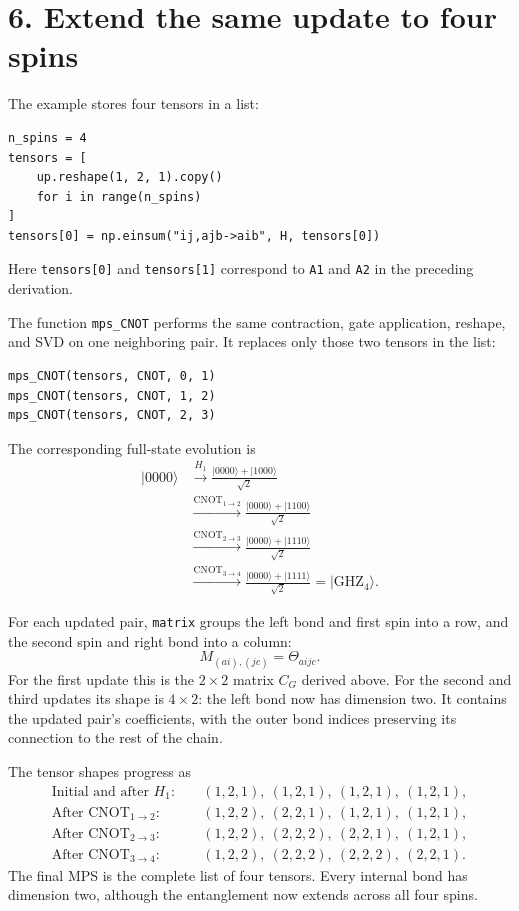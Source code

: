 \documentclass[11pt]{article}
\newcommand{\ket}[1]{\lvert #1\rangle}
\begin{document}
\newpage
\section*{6. Extend the same update to four spins}

The example stores four tensors in a list:
\begin{lstlisting}
n_spins = 4
tensors = [
    up.reshape(1, 2, 1).copy()
    for i in range(n_spins)
]
tensors[0] = np.einsum("ij,ajb->aib", H, tensors[0])
\end{lstlisting}
Here \texttt{tensors[0]} and \texttt{tensors[1]} correspond
to \texttt{A1} and \texttt{A2} in the preceding derivation.

The function \texttt{mps\_CNOT} performs the same contraction,
gate application, reshape, and SVD on one neighboring pair.
It replaces only those two tensors in the list:
\begin{lstlisting}
mps_CNOT(tensors, CNOT, 0, 1)
mps_CNOT(tensors, CNOT, 1, 2)
mps_CNOT(tensors, CNOT, 2, 3)
\end{lstlisting}

The corresponding full-state evolution is
\begin{align*}
\ket{0000}
&\xrightarrow{H_1}
\frac{\ket{0000}+\ket{1000}}{\sqrt2}\\
&\xrightarrow{\mathrm{CNOT}_{1\to2}}
\frac{\ket{0000}+\ket{1100}}{\sqrt2}\\
&\xrightarrow{\mathrm{CNOT}_{2\to3}}
\frac{\ket{0000}+\ket{1110}}{\sqrt2}\\
&\xrightarrow{\mathrm{CNOT}_{3\to4}}
\frac{\ket{0000}+\ket{1111}}{\sqrt2}
=\ket{\mathrm{GHZ}_4}.
\end{align*}

For each updated pair, \texttt{matrix} groups the left bond
and first spin into a row, and the second spin and right
bond into a column:
\[
M_{(ai),(jc)}=\Theta_{aijc}.
\]
For the first update this is the $2\times2$ matrix $C_G$
derived above. For the second and third updates its shape
is $4\times2$: the left bond now has dimension two.
It contains the updated pair's coefficients, with the outer
bond indices preserving its connection to the rest of the chain.

The tensor shapes progress as
\begin{align*}
\text{Initial and after }H_1:\quad&
(1,2,1),\ (1,2,1),\ (1,2,1),\ (1,2,1),\\
\text{After CNOT}_{1\to2}:\quad&
(1,2,2),\ (2,2,1),\ (1,2,1),\ (1,2,1),\\
\text{After CNOT}_{2\to3}:\quad&
(1,2,2),\ (2,2,2),\ (2,2,1),\ (1,2,1),\\
\text{After CNOT}_{3\to4}:\quad&
(1,2,2),\ (2,2,2),\ (2,2,2),\ (2,2,1).
\end{align*}
The final MPS is the complete list of four tensors.
Every internal bond has dimension two, although the
entanglement now extends across all four spins.
\end{document}

